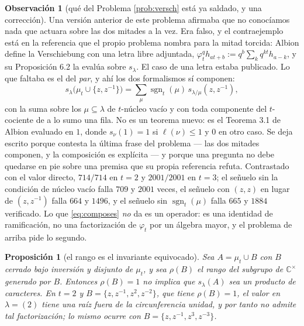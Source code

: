 \documentclass[11pt,reqno]{amsart}
\newcommand{\stverif}{\textcolor{hverif}{\small verificado}}
\theoremstyle{plain}
\newtheorem{proposition}[theorem]{Proposición}
\theoremstyle{definition}
\newtheorem{remark}[theorem]{Observación}
\newcommand{\CC}{\mathbb{C}}
\newcommand{\zt}{\mu_t}
\begin{document}
\begin{remark}[qué del Problema \ref{prob:versch} está ya saldado, y una corrección]\label{rem:composes}
Una versión anterior de este problema afirmaba que no conocíamos nada que actuara sobre las dos
mitades a la vez. Era falso, y el contraejemplo está en la referencia que el propio problema
nombra para la mitad torcida: Albion \cite[\S6.1]{Alb23} define la Verschiebung con una letra
libre adjuntada, $\varphi^q_t h_{at+b}:=q^b\sum_k q^{kt}h_{a-k}$, y su Proposición 6.2 la evalúa
sobre $s_\lambda$. El caso de una letra estaba publicado. Lo que faltaba es el del \emph{par}, y
ahí los dos formalismos sí componen:
\begin{equation}\label{eq:composes}
s_\lambda\bigl(\mu_t\cup\{z,z^{-1}\}\bigr)=\sum_{\mu}\operatorname{sgn}_t(\mu)\,
s_{\lambda/\mu}(z,z^{-1}),
\end{equation}
con la suma sobre los $\mu\subseteq\lambda$ de $t$-núcleo vacío y con toda componente del
$t$-cociente de a lo sumo una fila. No es un teorema nuevo: es el Teorema 3.1 de Albion evaluado
en $1$, donde $s_\nu(1)=1$ si $\ell(\nu)\le1$ y $0$ en otro caso. Se deja escrito porque contesta
la última frase del problema --- las dos mitades componen, y la composición es explícita --- y
porque una pregunta no debe quedarse en pie sobre una premisa que su propia referencia refuta.
Contrastado con el valor directo, $714/714$ en $t=2$ y $2001/2001$ en $t=3$; el señuelo sin la
condición de núcleo vacío falla $709$ y $2001$ veces, el señuelo con $(z,z)$ en lugar de
$(z,z^{-1})$ falla $664$ y $1496$, y el señuelo sin $\operatorname{sgn}_t(\mu)$ falla $665$ y
$1884$ \stverif. Lo que \eqref{eq:composes} \emph{no} da es un operador: es una identidad de
ramificación, no una factorización de $\varphi_t$ por un álgebra mayor, y el problema de arriba
pide lo segundo.
\end{remark}

\begin{proposition}[el rango es el invariante equivocado]\label{conj:rank}
Sea $A=\zt\cup B$ con $B$ cerrado bajo inversión y disjunto de $\zt$, y sea $\rho(B)$ el rango del
subgrupo de $\CC^{\times}$ generado por $B$. Entonces $\rho(B)=1$ no implica que $s_\lambda(A)$ sea
un producto de caracteres. En $t=2$ y $B=\{z,z^{-1},z^{2},z^{-2}\}$, que tiene $\rho(B)=1$, el valor
en $\lambda=(2)$ tiene una raíz fuera de la circunferencia unidad, y por tanto no admite tal
factorización; lo mismo ocurre con $B=\{z,z^{-1},z^{3},z^{-3}\}$.
\end{proposition}
\end{document}
